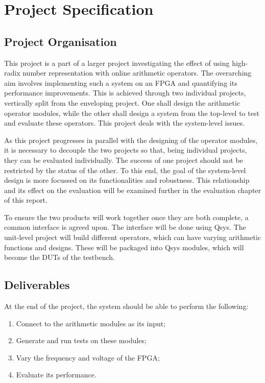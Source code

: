 \section{Project Specification}

\subsection{Project Organisation}
This project is a part of a larger project investigating the effect of using
high-radix number representation with online arithmetic operators.
The overarching aim involves implementing such a system on an FPGA and
quantifying its performance improvements.
This is achieved through two individual projects, vertically split from
the enveloping project.
One shall design the arithmetic operator modules,
while the other shall design a system from the top-level to test and
evaluate these operators.
This project deals with the system-level issues.

As this project progresses in parallel with the designing of the operator
modules, it is necessary to decouple the two projects so that, being individual
projects, they can be evaluated individually.
The success of one project should not be restricted by the status of the other.
To this end, the goal of the system-level design is more focussed on its
functionalities and robustness.
This relationship and its effect on the evaluation will be examined further in
the evaluation chapter of this report.

To ensure the two products will work together once they are both complete, a
common interface is agreed upon.
The interface will be done using Qsys.
The unit-level project will build different operators, which can have varying
arithmetic functions and designs.
These will be packaged into Qsys modules, which will become the DUTs of the
testbench.

\subsection{Deliverables}
At the end of the project, the system should be able to perform the following:
\begin{enumerate}
  \item Connect to the arithmetic modules as its input;
  \item Generate and run tests on these modules;
  \item Vary the frequency and voltage of the FPGA;
  \item Evaluate its performance.
\end{enumerate}

